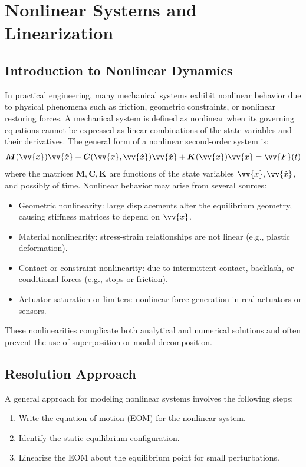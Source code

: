 
\chapter{Nonlinear Systems and Linearization}

\section{Introduction to Nonlinear Dynamics}

In practical engineering, many mechanical systems exhibit nonlinear behavior due to physical phenomena such as friction, geometric constraints, or nonlinear restoring forces. A mechanical system is defined as nonlinear when its governing equations cannot be expressed as linear combinations of the state variables and their derivatives. The general form of a nonlinear second-order system is:
\[
\boldsymbol{M}(\vv{x}) \vv{\ddot{x}} + \boldsymbol{C}(\vv{x}, \vv{\dot{x}}) \vv{\dot{x}} + \boldsymbol{K}(\vv{x}) \vv{x} = \vv{F}(t)
\]
where the matrices \( \boldsymbol{M}, \boldsymbol{C}, \boldsymbol{K} \) are functions of the state variables \( \vv{x}, \vv{\dot{x}} \), and possibly of time. Nonlinear behavior may arise from several sources:
\begin{itemize}
  \item Geometric nonlinearity: large displacements alter the equilibrium geometry, causing stiffness matrices to depend on \( \vv{x} \).
  \item Material nonlinearity: stress-strain relationships are not linear (e.g., plastic deformation).
  \item Contact or constraint nonlinearity: due to intermittent contact, backlash, or conditional forces (e.g., stops or friction).
  \item Actuator saturation or limiters: nonlinear force generation in real actuators or sensors.
\end{itemize}

These nonlinearities complicate both analytical and numerical solutions and often prevent the use of superposition or modal decomposition.

\section{Resolution Approach}

A general approach for modeling nonlinear systems involves the following steps:
\begin{enumerate}
  \item Write the equation of motion (EOM) for the nonlinear system.
  \item Identify the static equilibrium configuration.
  \item Linearize the EOM about the equilibrium point for small perturbations.
\end{enumerate}

